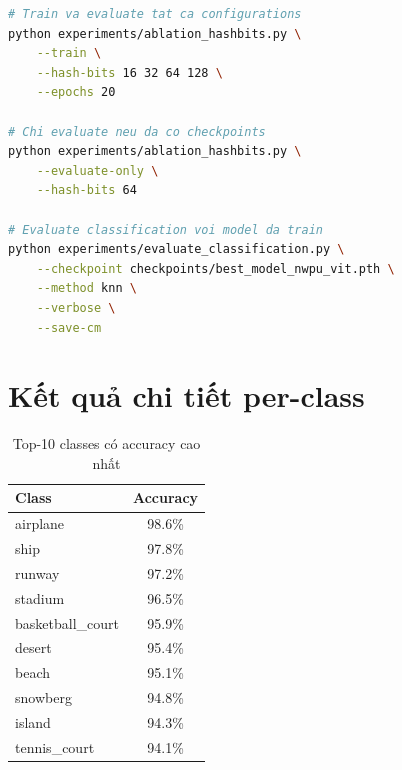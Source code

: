\documentclass[12pt,a4paper]{article}
\begin{document}
\begin{lstlisting}[caption={Chạy ablation study},language=bash]
# Train va evaluate tat ca configurations
python experiments/ablation_hashbits.py \
    --train \
    --hash-bits 16 32 64 128 \
    --epochs 20

# Chi evaluate neu da co checkpoints
python experiments/ablation_hashbits.py \
    --evaluate-only \
    --hash-bits 64

# Evaluate classification voi model da train
python experiments/evaluate_classification.py \
    --checkpoint checkpoints/best_model_nwpu_vit.pth \
    --method knn \
    --verbose \
    --save-cm
\end{lstlisting}

\section{Kết quả chi tiết per-class}

\begin{table}[H]
\centering
\caption{Top-10 classes có accuracy cao nhất}
\begin{tabular}{lc}
\toprule
\textbf{Class} & \textbf{Accuracy} \\
\midrule
airplane & 98.6\% \\
ship & 97.8\% \\
runway & 97.2\% \\
stadium & 96.5\% \\
basketball\_court & 95.9\% \\
desert & 95.4\% \\
beach & 95.1\% \\
snowberg & 94.8\% \\
island & 94.3\% \\
tennis\_court & 94.1\% \\
\bottomrule
\end{tabular}
\end{table}
\end{document}
